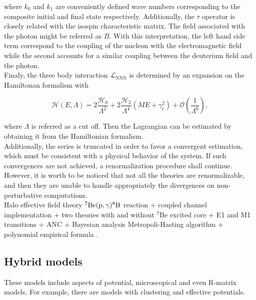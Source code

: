 \documentclass[openany]{book}
\begin{document}
where $k_0$ and $k_1$ are conveniently defined wave numbers corresponding to the composite initial and final state respectively. Additionally, the $\tau$ operator is closely related with the isospin characteristic matrix. The field associated with the photon might be referred as $B$. With this interpretation, the left hand side term correspond to the coupling of the nucleon with the electromagnetic field while the second accounts for a similar coupling between the deuterium field and the photon.  \\

Finaly, the three body interaction $\mathcal{L}_{\mathrm{NNN}}$ is determined by an expansion on the Hamiltonan formalism with 

\begin{equation}\label{eq:micro_EFT_lagrangian_hamiltonianNNN}
	\mathcal{H}(E, \Lambda ) = 2  \frac{\mathcal{H}_0}{\Lambda^2} + 2 \frac{\mathcal{H}_2}{\Lambda^4}(ME + \gamma^2_t) + \mathcal{O} \left( \frac{1}{\Lambda^6} \right),
\end{equation}

where $\Lambda$ is referred as a cut off. Then the Lagrangian can be estimated by obtaining it from the Hamiltonian formalism. \\

Additionally, the series is truncated in order to favor a convergent estimation, which must be consistent with a physical behavior of the system. If such convergences are not achieved, a renormalization procedure shall continue. However, it is worth to be noticed that not all the theories are renormalizable, and then they are unable to handle appropriately the divergences on non-perturbative computations. \\

 Halo effective field theory $\mathrm{{}^{7}Be(p, \gamma){}^{8}B}$ reaction + coupled channel implementation + two theories with and without $\mathrm{{}^{7}Be}$ excited core  + E1 and M1 transitions + ANC + Bayesian analysis Metropoli-Hasting algorithm + polynomial empirical formula  \cite{higa_premarathna_rupak_2022}. \\

\subsection{Hybrid models} \label{sub:special_hybrid}

These models include aspects of potential, microscopical and even R-matrix models. For example, there are models with clustering and effective potentials. \\
\end{document}
